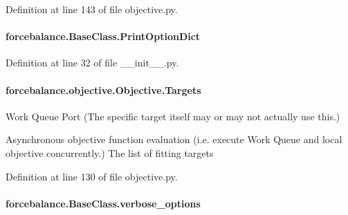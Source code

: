 Definition at line 143 of file objective.\-py.

\hypertarget{classforcebalance_1_1BaseClass_afc6659278497d7245bc492ecf405ccae}{
\paragraph[{Print\-Option\-Dict}]{\setlength{\rightskip}{0pt plus 5cm}forcebalance.\-Base\-Class.\-Print\-Option\-Dict\hspace{0.3cm}{\ttfamily [inherited]}}}\label{classforcebalance_1_1BaseClass_afc6659278497d7245bc492ecf405ccae}


Definition at line 32 of file \-\_\-\-\_\-init\-\_\-\-\_\-.\-py.

\hypertarget{classforcebalance_1_1objective_1_1Objective_a20e0d09fb2b889b5f604e75a020601a8}{
\paragraph[{Targets}]{\setlength{\rightskip}{0pt plus 5cm}forcebalance.\-objective.\-Objective.\-Targets}}\label{classforcebalance_1_1objective_1_1Objective_a20e0d09fb2b889b5f604e75a020601a8}


Work Queue Port (The specific target itself may or may not actually use this.) 

Asynchronous objective function evaluation (i.\-e. execute Work Queue and local objective concurrently.) The list of fitting targets 

Definition at line 130 of file objective.\-py.

\hypertarget{classforcebalance_1_1BaseClass_afd68efa29ccd2f320f4cf82198214aac}{
\paragraph[{verbose\-\_\-options}]{\setlength{\rightskip}{0pt plus 5cm}forcebalance.\-Base\-Class.\-verbose\-\_\-options\hspace{0.3cm}{\ttfamily [inherited]}}}\label{classforcebalance_1_1BaseClass_afd68efa29ccd2f320f4cf82198214aac}


